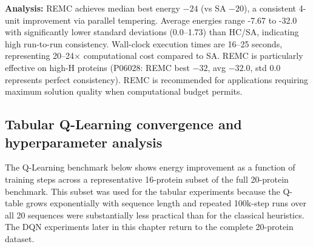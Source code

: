 \textbf{Analysis:} REMC achieves median best energy $-24$ (vs SA $-20$), a consistent 4-unit improvement via parallel tempering. Average energies range -7.67 to -32.0 with significantly lower standard deviations (0.0--1.73) than HC/SA, indicating high run-to-run consistency. Wall-clock execution times are 16--25 seconds, representing 20--24$\times$ computational cost compared to SA. REMC is particularly effective on high-H proteins (P06028: REMC best $-32$, avg $-32.0$, std 0.0 represents perfect consistency). REMC is recommended for applications requiring maximum solution quality when computational budget permits.
\FloatBarrier

\subsection{Tabular Q-Learning convergence and hyperparameter analysis}
\label{cap4:subsec_ql_results}

The Q-Learning benchmark below shows energy improvement as a function of training steps across a representative 16-protein subset of the full 20-protein benchmark. This subset was used for the tabular experiments because the Q-table grows exponentially with sequence length and repeated 100k-step runs over all 20 sequences were substantially less practical than for the classical heuristics. The DQN experiments later in this chapter return to the complete 20-protein dataset.

